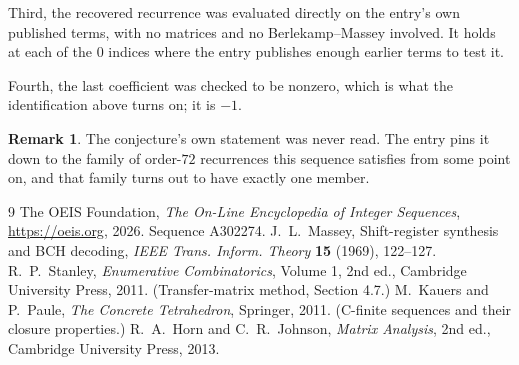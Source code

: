 \documentclass[11pt,a4paper]{article}
\theoremstyle{plain}
\theoremstyle{definition}
\newtheorem{remark}[theorem]{Remark}
\begin{document}
Third, the recovered recurrence was evaluated directly on the entry's own published terms, with
no matrices and no Berlekamp--Massey involved. It holds at each of the $0$ indices where
the entry publishes enough earlier terms to test it.

Fourth, the last coefficient was checked to be nonzero, which is what the identification above
turns on; it is $-1$.

\begin{remark}
The conjecture's own statement was never read. The entry pins it down to the family of
order-$72$ recurrences this sequence satisfies from some point on, and that family turns
out to have exactly one member.
\end{remark}

\begin{thebibliography}{9}
 The OEIS Foundation, \emph{The On-Line Encyclopedia of Integer
Sequences}, \url{https://oeis.org}, 2026. Sequence A302274.
 J.~L.~Massey, Shift-register synthesis and BCH decoding, \emph{IEEE
Trans. Inform. Theory} \textbf{15} (1969), 122--127.
 R.~P.~Stanley, \emph{Enumerative Combinatorics}, Volume 1, 2nd ed.,
Cambridge University Press, 2011. (Transfer-matrix method, Section 4.7.)
 M.~Kauers and P.~Paule, \emph{The Concrete Tetrahedron}, Springer, 2011.
(C-finite sequences and their closure properties.)
 R.~A.~Horn and C.~R.~Johnson, \emph{Matrix Analysis}, 2nd ed., Cambridge
University Press, 2013.
\end{thebibliography}
\end{document}
